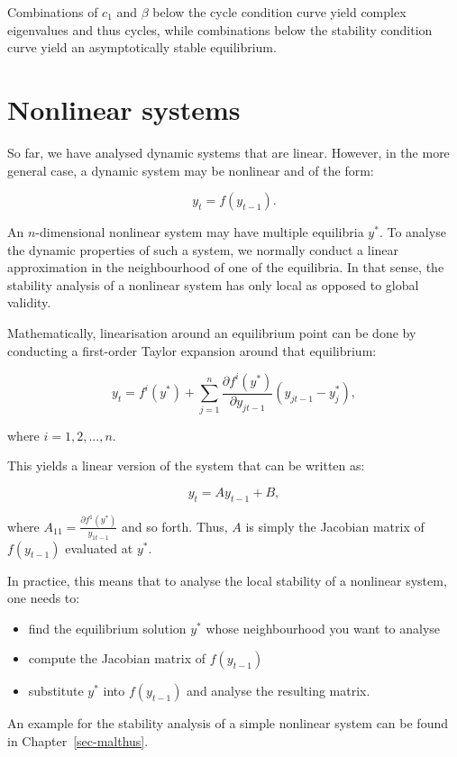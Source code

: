 \documentclass[
  letterpaper,
  DIV=11,
  numbers=noendperiod]{scrreprt}
\providecommand{\tightlist}{%
  \setlength{\itemsep}{0pt}\setlength{\parskip}{0pt}}\usepackage{longtable,booktabs,array}
\begin{document}
Combinations of \(c_1\) and \(\beta\) below the cycle condition curve
yield complex eigenvalues and thus cycles, while combinations below the
stability condition curve yield an asymptotically stable equilibrium.

\section{Nonlinear systems}\label{nonlinear-systems}

So far, we have analysed dynamic systems that are linear. However, in
the more general case, a dynamic system may be nonlinear and of the
form:

\[
y_t=f(y_{t-1}).
\]

An \(n\)-dimensional nonlinear system may have multiple equilibria
\(y^*\). To analyse the dynamic properties of such a system, we normally
conduct a linear approximation in the neighbourhood of one of the
equilibria. In that sense, the stability analysis of a nonlinear system
has only local as opposed to global validity.

Mathematically, linearisation around an equilibrium point can be done by
conducting a first-order Taylor expansion around that equilibrium:

\[
y_t=f^i(y^*) + \sum_{j=1}^{n}\frac{\partial f^i(y^*)}{\partial y_{jt-1}}(y_{jt-1}-y_j^*),
\]

where \(i=1,2,...,n\).

This yields a linear version of the system that can be written as:

\[
y_{t}=Ay_{t-1}+B,
\]

where \(A_{11}=\frac{\partial f^1(y^*)}{y_{1t-1}}\) and so forth. Thus,
\(A\) is simply the Jacobian matrix of \(f(y_{t-1})\) evaluated at
\(y^*\).

In practice, this means that to analyse the local stability of a
nonlinear system, one needs to:

\begin{itemize}
\tightlist
\item
  find the equilibrium solution \(y^*\) whose neighbourhood you want to
  analyse
\item
  compute the Jacobian matrix of \(f(y_{t-1})\)
\item
  substitute \(y^*\) into \(f(y_{t-1})\) and analyse the resulting
  matrix.
\end{itemize}

An example for the stability analysis of a simple nonlinear system can
be found in Chapter~\ref{sec-malthus}.
\end{document}
